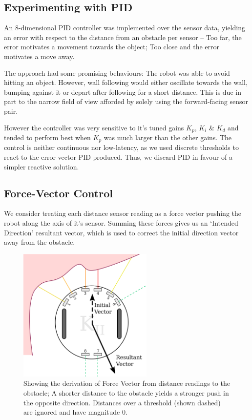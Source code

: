 \documentclass[11pt, a4paper]{article}
\begin{document}
\subsection{Experimenting with PID}

An 8-dimensional PID controller was implemented over the sensor data, yielding an error 
with respect to the distance from an obstacle per sensor -- Too far, the error motivates 
a movement towards the object; Too close and the error motivates a move away.

The approach had some promising behaviours: The robot was able to avoid hitting an object.
However, wall following would either oscillate towards the wall, bumping against it or 
depart after following for a short distance. This is due in part to the narrow field 
of view afforded by solely using the forward-facing sensor pair.

However the controller was very sensitive to it's tuned gains ${K_p}$, ${K_i}$ \&
${K_d}$ and tended to perform best when ${K_p}$ was much larger than the other gains.
The control is neither continuous nor low-latency, as we used discrete thresholds to 
react to the error vector PID produced. Thus, we discard PID in favour 
of a simpler reactive solution.


\subsection{Force-Vector Control}

We consider treating each distance sensor reading as a force vector pushing 
the robot along the axis of it's sensor. Summing these forces gives us an 
`Intended Direction' resultant vector, which is used to correct the initial 
direction vector away from the obstacle.

\begin{figure}[h]
  \begin{center}
    \includegraphics[width=18em]{../assets/force-vector.png}
    \caption{Showing the derivation of Force Vector from distance readings to the
      obstacle; A shorter distance to the obstacle yields a stronger push in the 
      opposite direction. Distances over a threshold (shown dashed) are ignored 
      and have magnitude $0$.}
  \end{center}
\end{figure}
\end{document}
